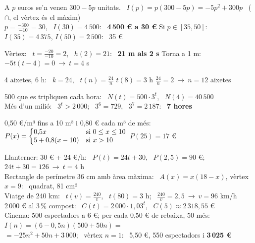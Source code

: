 \documentclass[11pt,a4paper]{article}
\makeatletter
\newcommand{\cas}[1]{\left\{\begin{array}{@{}l@{\quad}l@{}}#1\end{array}\right.}
\makeatother
\begin{document}
\vfill
\begin{exemple}
A $p$ euros se'n venen $300-5p$ unitats. \ $I(p)=p(300-5p)=-5p^2+300p$ \ ($\cap$, el vèrtex és el màxim)\\[3pt]
$p=\frac{-300}{-10}=30$, \ $I(30)=4\,500$: \ \textbf{4\,500 € a 30 €} \qquad Si $p\in[35,50]$: \ $I(35)=4\,375$, $I(50)=2\,500$: \ 35 €
\end{exemple}

\vfill
\begin{exemple}[Quadràtica: \ altura d'una pilota \ $h(t)=-5t^2+20t+1$]
Vèrtex: \ $t=\frac{-20}{-10}=2$, \ $h(2)=21$: \ \textbf{21 m als 2 s} \qquad Torna a 1 m: \ $-5t(t-4)=0\ \to\ t=4$ s
\end{exemple}

\newpage
\begin{exemple}
4 aixetes, 6 h: \ $k=24$, \ $t(n)=\frac{24}{n}$ \qquad $t(8)=3$ h \qquad $\frac{24}{n}=2\ \to\ n=12$ aixetes
\end{exemple}

\vfill
\begin{exemple}
500 que es tripliquen cada hora: \ $N(t)=500\cdot3^t$, \ $N(4)=40\,500$\\[3pt]
Més d'un milió: \ $3^t>2\,000$; \ $3^6=729$, \ $3^7=2\,187$: \ \textbf{7 hores}
\end{exemple}

\vfill
\begin{exemple}
0,50 €/m³ fins a 10 m³ i 0,80 € cada m³ de més: \ $P(x)=\cas{0{,}5x & \text{si } 0\le x\le10\\ 5+0{,}8(x-10) & \text{si } x>10}$ \quad $P(25)=17$ €
\end{exemple}

\vfill
\begin{exemple}
Llanterner: 30 € + 24 €/h: \ $P(t)=24t+30$, \ $P(2{,}5)=90$ €; \ $24t+30=126\ \to\ t=4$ h\\[4pt]
Rectangle de perímetre 36 cm amb àrea màxima: \ $A(x)=x(18-x)$, vèrtex $x=9$: \ quadrat, 81 cm²\\[4pt]
Viatge de 240 km: \ $t(v)=\frac{240}{v}$, \ $t(80)=3$ h; \ $\frac{240}{v}=2{,}5\ \to\ v=96$ km/h\\[4pt]
2\,000 € al 3\,\% compost: \ $C(t)=2\,000\cdot1{,}03^t$, \ $C(5)\approx2\,318{,}55$ €\\[4pt]
Cinema: 500 espectadors a 6 €; per cada 0,50 € de rebaixa, 50 més: \ $I(n)=(6-0{,}5n)(500+50n)=$\\ \hspace*{1em}$=-25n^2+50n+3\,000$; \ vèrtex $n=1$: \ 5,50 €, 550 espectadors i \textbf{3\,025 €}
\end{exemple}
\end{document}
